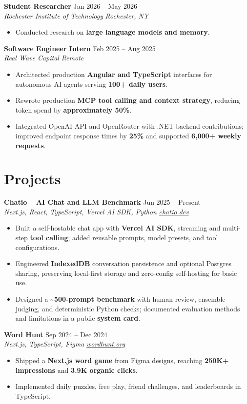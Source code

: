 \documentclass[10pt,letterpaper]{article}
\newif\ifresumeFirstRole
\newcommand{\resumeRole}[4]{%
  \ifresumeFirstRole
    \global\resumeFirstRolefalse
  \else
    \vspace{0pt plus 1fill}%
  \fi
  \textbf{#1} \hfill #2\\
  \textit{#3} \hfill \textit{#4}
}
\begin{document}
\resumeRole{Student Researcher}{Jan 2026 -- May 2026}{Rochester Institute of Technology}{Rochester, NY}
\begin{itemize}
  \item Conducted research on \textbf{large language models and memory}.
\end{itemize}

\resumeRole{Software Engineer Intern}{Feb 2025 -- Aug 2025}{Real Wave Capital}{Remote}
\begin{itemize}
  \item Architected production \textbf{Angular and TypeScript} interfaces for autonomous AI agents serving \textbf{100+ daily users}.
  \item Rewrote production \textbf{MCP tool calling and context strategy}, reducing token spend by \textbf{approximately 50\%}.
  \item Integrated OpenAI API and OpenRouter with .NET backend contributions; improved endpoint response times by \textbf{25\%} and supported \textbf{6,000+ weekly requests}.
\end{itemize}

\section*{Projects}
\resumeRole{Chatio -- AI Chat and LLM Benchmark}{Jun 2025 -- Present}{Next.js, React, TypeScript, Vercel AI SDK, Python}{\href{https://chatio.dev}{chatio.dev}}
\begin{itemize}
  \item Built a self-hostable chat app with \textbf{Vercel AI SDK}, streaming and multi-step \textbf{tool calling}; added reusable prompts, model presets, and tool configurations.
  \item Engineered \textbf{IndexedDB} conversation persistence and optional Postgres sharing, preserving local-first storage and zero-config self-hosting for basic use.
  \item Designed a \textbf{\textasciitilde{}500-prompt benchmark} with human review, ensemble judging, and deterministic Python checks; documented evaluation methods and limitations in a public \textbf{system card}.
\end{itemize}

\resumeRole{Word Hunt}{Sep 2024 -- Dec 2024}{Next.js, TypeScript, Figma}{\href{https://wordhunt.org}{wordhunt.org}}
\begin{itemize}
  \item Shipped a \textbf{Next.js word game} from Figma designs, reaching \textbf{250K+ impressions} and \textbf{3.9K organic clicks}.
  \item Implemented daily puzzles, free play, friend challenges, and leaderboards in TypeScript.
\end{itemize}
\end{document}
